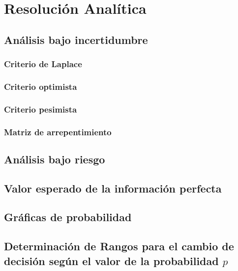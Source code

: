 \section{Resolución Analítica}
\subsection{Análisis bajo incertidumbre}
\subsubsection{Criterio de Laplace}
\subsubsection{Criterio optimista}
\subsubsection{Criterio pesimista}
\subsubsection{Matriz de arrepentimiento}
\subsection{Análisis bajo riesgo}
\subsection{Valor esperado de la información perfecta}
\subsection{Gráficas de probabilidad}
\subsection[Rangos para el cambio de Decisión]{Determinación de Rangos para el cambio de decisión según el valor de la probabilidad $p$}
\pagebreak